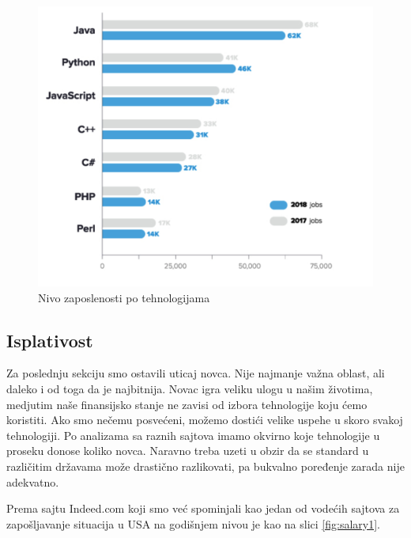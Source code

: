 \documentclass[a4paper]{article}
\begin{document}
\begin{figure}[h!]
\begin{center}
\includegraphics[scale=0.4]{slike/jobsIndeed.png}
\end{center}
\caption{Nivo zaposlenosti po tehnologijama}
\label{fig:jobsIndeed}
\end{figure}

\subsection{Isplativost}
\label{subsec:isplativost}
Za poslednju sekciju smo ostavili uticaj novca. Nije najmanje važna oblast, ali daleko i od toga da je najbitnija. Novac igra veliku ulogu u našim životima, medjutim naše finansijsko stanje ne zavisi od izbora tehnologije koju ćemo koristiti. Ako smo nečemu posvećeni, možemo dostići velike uspehe u skoro svakoj tehnologiji. Po analizama sa raznih sajtova imamo okvirno koje tehnologije u proseku donose koliko novca. Naravno treba uzeti u obzir da se standard u različitim državama može drastično razlikovati, pa bukvalno poređenje zarada nije adekvatno.

Prema sajtu Indeed.com \cite{salary} koji smo već spominjali kao jedan od vodećih sajtova za zapošljavanje situacija u USA na godišnjem nivou je kao na slici \ref{fig:salary1}.
\end{document}
